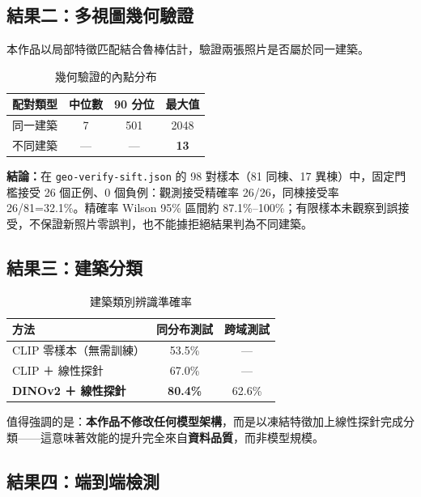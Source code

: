 \documentclass[11pt,a4paper,fontset=windows]{ctexart}
\newcommand{\hl}[1]{\textbf{\color{gold}#1}}
\newcommand{\warn}[1]{\textbf{\color{red2}#1}}
\begin{document}
\subsection{結果二：多視圖幾何驗證}

本作品以局部特徵匹配結合魯棒估計，驗證兩張照片是否屬於同一建築。

\begin{table}[H]
\centering
\small
\caption{幾何驗證的內點分布}
\begin{tabular}{lccc}
\toprule
\textbf{配對類型} & \textbf{中位數} & \textbf{90 分位} & \textbf{最大值} \\
\midrule
同一建築 & 7 & 501 & 2048 \\
不同建築 & — & — & \warn{13} \\
\bottomrule
\end{tabular}
\end{table}

\textbf{結論：}在 \texttt{geo-verify-sift.json} 的 98 對樣本（81 同棟、17 異棟）中，固定門檻接受 26 個正例、0 個負例：觀測接受精確率 26/26，同棟接受率 26/81=32.1\%。精確率 Wilson 95\% 區間約 87.1\%--100\%；有限樣本未觀察到誤接受，不保證新照片零誤判，也不能據拒絕結果判為不同建築。

\subsection{結果三：建築分類}

\begin{table}[H]
\centering
\small
\caption{建築類別辨識準確率}
\begin{tabular}{lcc}
\toprule
\textbf{方法} & \textbf{同分布測試} & \textbf{跨域測試} \\
\midrule
CLIP 零樣本（無需訓練） & 53.5\% & — \\
CLIP ＋ 線性探針 & 67.0\% & — \\
\textbf{DINOv2 ＋ 線性探針} & \hl{80.4\%} & 62.6\% \\
\bottomrule
\end{tabular}
\end{table}

值得強調的是：\textbf{本作品不修改任何模型架構}，而是以凍結特徵加上線性探針完成分類——這意味著效能的提升完全來自\textbf{資料品質}，而非模型規模。

\subsection{結果四：端到端檢測}
\end{document}
